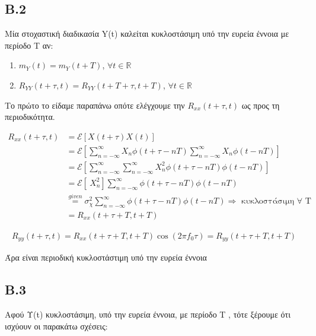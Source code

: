 \documentclass[11pt]{article}
\begin{document}
    \subsection*{B.2}
    Μία στοχαστική διαδικασία Y(t) καλείται κυκλοστάσιμη υπό την ευρεία έννοια με περίοδο T αν:
    
    \begin{enumerate}
      \item $m_Y (t) = m_Y (t + T )$, \space $\forall t \in \mathbb{R}$
      \item $R_{YY} (t + τ, t) = R_{YY} (t + T + τ, t + T )$, \space $\forall t \in \mathbb{R}$
    \end{enumerate}

    \par \noindent
    Το πρώτο το είδαμε παραπάνω οπότε ελέγχουμε την $R_{xx}(t+\tau,t)$ ως προς τη περιοδικότητα.
    
    \begin{align}
        R_{xx}(t+\tau,t) &= \mathcal{E}[X(t+\tau)X(t)] \nonumber \\
        &= \mathcal{E}\left[ \sum_{n=-\infty}^{\infty} X_n \phi(t+\tau-nT) \sum_{n=-\infty}^{\infty} X_n \phi(t-nT) \right] \nonumber \\
        &= \mathcal{E}\left[\sum_{n=-\infty}^{\infty} \sum_{n=-\infty}^{\infty} X_n^2 \phi(t+\tau-nT) \phi(t-nT)  \right] \nonumber \\
        &= \mathcal{E}\left[\ X_n^2 \right] \sum_{n=-\infty}^{\infty} \phi(t+\tau-nT) \phi(t-nT) \nonumber \\
        &\overset{given}{=} \boxed{ σ_χ^2 \sum_{n=-\infty}^{\infty} \phi(t+\tau-nT) \phi(t-nT)}  \Rightarrow \mbox{ κυκλοστάσιμη } \forall \mbox{ T} \label{R-xx} \\ 
        &= R_{xx}(t+\tau+T,t+T) \nonumber
    \end{align}
    
    \begin{align}
        \boxed{R_{yy}(t+\tau,t) = R_{xx}(t+\tau+T,t+T)\cos(2\pi f_0\tau) = R_{yy}(t+\tau+T,t+T)}
    \end{align}
    
    \par \noindent
    Άρα είναι περιοδική κυκλοστάστιμη υπό την ευρεία έννοια
    
    \subsection*{B.3}
    Αφού Υ(t) κυκλοστάσιμη, υπό την ευρεία έννοια, με περίοδο T , τότε ξέρουμε ότι ισχύουν οι παρακάτω σχέσεις:
    
\end{document}
